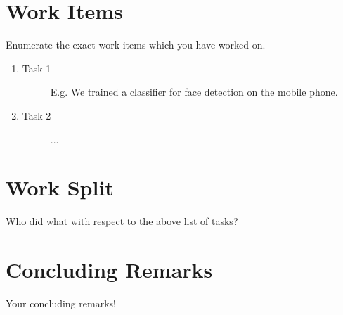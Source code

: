 \documentclass[
10pt, %
a4paper, %
oneside, %
headinclude,footinclude, %
BCOR5mm, %
]{scrartcl}
\begin{document}
\section{Work Items}
Enumerate the exact work-items which you have worked on. 
\begin{enumerate}
\item 
	\begin{description}
	\item[Task 1] E.g. We trained a classifier for face detection on the mobile phone.
	\end{description}
	\item 
	\begin{description}
	\item[Task 2] ...
	\end{description}
\end{enumerate}

\section{Work Split}
Who did what with respect to the above list of tasks?

\section{Concluding Remarks}
Your concluding remarks!


\renewcommand{\refname}{\spacedlowsmallcaps{References}} %




\end{document}
